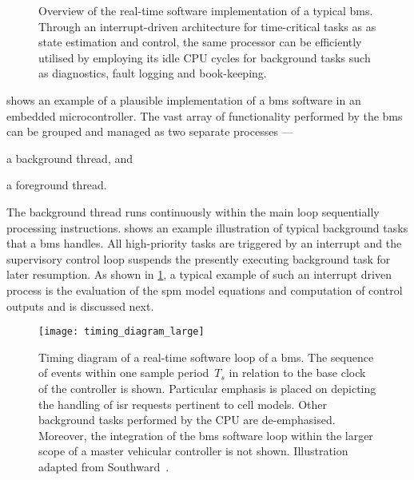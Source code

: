 \begin{figure}[!tbp]
{\begin{subfigure}[t]{\wd\algboxA}
            \usebox{\algboxA}
        \end{subfigure}
        \hfill
        \begin{subfigure}[t]{\wd\algboxB}
            \label{subfig:fgRTprocess}
            \raisebox{\dimexpr.5\ht\algboxA-.5\ht\algboxB}{%
                \usebox{\algboxB}%
            }%
        \end{subfigure}
    }
    \caption[Overview of real-time software implementation of a typical
    ]{Overview of the real-time software implementation of a typical
        \gls{bms}. Through an interrupt-driven architecture for time-critical tasks as
        as state estimation and control, the same processor can be
        efficiently utilised by employing its idle CPU cycles for background
    tasks such as diagnostics, fault logging and book-keeping.}
    \label{fig:basicRTCsoftwarearch}
\end{figure}

 shows  an example of a  plausible implementation
of  a \gls{bms}  software  in an  embedded microcontroller.  The  vast array  of
functionality  performed by  the \gls{bms}  can be  grouped and  managed as  two
separate processes ---
\begin{enumerate*}[label=\roman*)]
    \item a background thread, and
    \item a foreground thread.
\end{enumerate*}
The  background  thread runs  continuously  within  the main  loop  sequentially
processing instructions.  shows an example illustration
of typical  background tasks that  a \gls{bms} handles. All  high-priority tasks
are  triggered  by  an  interrupt  and the  supervisory  control  loop  suspends
the  presently executing  background  task  for later  resumption.  As shown  in
\cref{subfig:fgRTprocess}, a typical example of such an interrupt driven process
is the  evaluation of the \gls{spm}  model equations and computation  of control
outputs and is discussed next.

\begin{figure}[!tbp]
    \centering
    \texttt{[image: timing\_diagram\_large]}
    \caption[Timing diagram of a real-time software loop of a ]
    {Timing diagram of a real-time software loop of a \gls{bms}. The sequence of
        events within one sample period~$T_s$ in relation to the base clock of
        the controller is shown. Particular emphasis is placed on depicting the
        handling of \gls{isr} requests pertinent to cell models. Other
        background tasks performed by the CPU are de-emphasised. Moreover, the
        integration of the  \gls{bms} software loop within  the larger  scope of
        a master  vehicular controller is not shown. Illustration adapted from
    Southward~\cite{Southward2011}.}
    \label{fig:timingdiagramBig}
\end{figure}


